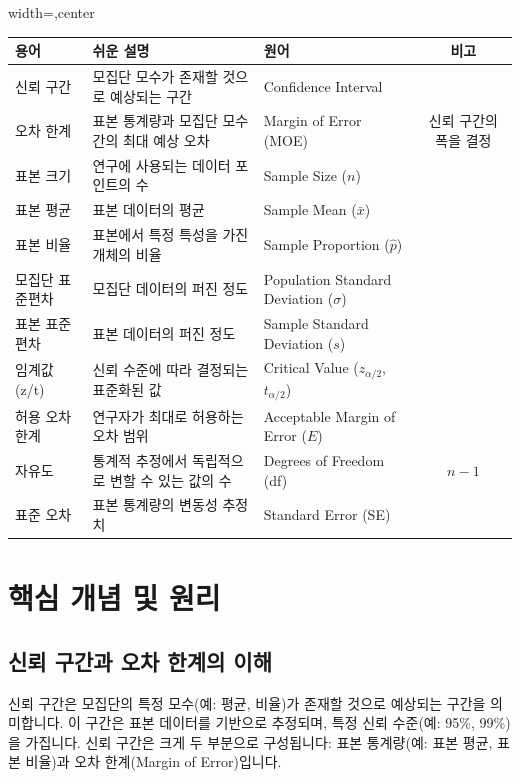 \documentclass[11pt,a4paper]{article}
\begin{document}
\begin{enumerate}
\begin{enumerate}
\begin{adjustbox}{width=\textwidth,center}
\begin{tabular}{lllc}
\toprule
\textbf{용어} & \textbf{쉬운 설명} & \textbf{원어} & \textbf{비고} \\
\midrule
신뢰 구간 & 모집단 모수가 존재할 것으로 예상되는 구간 & Confidence Interval & \\
오차 한계 & 표본 통계량과 모집단 모수 간의 최대 예상 오차 & Margin of Error (MOE) & 신뢰 구간의 폭을 결정 \\
표본 크기 & 연구에 사용되는 데이터 포인트의 수 & Sample Size (\(n\)) & \\
표본 평균 & 표본 데이터의 평균 & Sample Mean (\(\bar{x}\)) & \\
표본 비율 & 표본에서 특정 특성을 가진 개체의 비율 & Sample Proportion (\(\hat{p}\)) & \\
모집단 표준편차 & 모집단 데이터의 퍼진 정도 & Population Standard Deviation (\(\sigma\)) & \\
표본 표준편차 & 표본 데이터의 퍼진 정도 & Sample Standard Deviation (\(s\)) & \\
임계값 (z/t) & 신뢰 수준에 따라 결정되는 표준화된 값 & Critical Value (\(z_{\alpha/2}\), \(t_{\alpha/2}\)) & \\
허용 오차 한계 & 연구자가 최대로 허용하는 오차 범위 & Acceptable Margin of Error (\(E\)) & \\
자유도 & 통계적 추정에서 독립적으로 변할 수 있는 값의 수 & Degrees of Freedom (df) & \(n-1\) \\
표준 오차 & 표본 통계량의 변동성 추정치 & Standard Error (SE) & \\
\bottomrule
\end{tabular}
\end{adjustbox}

\newpage
\section*{핵심 개념 및 원리}

\subsection*{신뢰 구간과 오차 한계의 이해}
신뢰 구간은 모집단의 특정 모수(예: 평균, 비율)가 존재할 것으로 예상되는 구간을 의미합니다. 이 구간은 표본 데이터를 기반으로 추정되며, 특정 신뢰 수준(예: 95\%, 99\%)을 가집니다. 신뢰 구간은 크게 두 부분으로 구성됩니다: 표본 통계량(예: 표본 평균, 표본 비율)과 오차 한계(Margin of Error)입니다.


\end{enumerate}
\end{enumerate}
\end{document}
